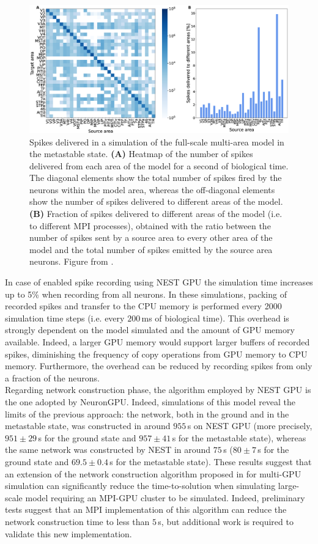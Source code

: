 \documentclass[a4paper, 12pt, twoside, openright]{book}
\begin{document}
\begin{figure}[h]
\centering
\includegraphics[width=\columnwidth]{figures/spikes_delivered.eps}
\caption{Spikes delivered in a simulation of the full-scale multi-area model in the metastable state. \textbf{(A)} Heatmap of the number of spikes delivered from each area of the model for a second of biological time. The diagonal elements show the total number of spikes fired by the neurons within the model area, whereas the off-diagonal elements show the number of spikes delivered to different areas of the model. \textbf{(B)} Fraction of spikes delivered to different areas of the model (i.e. to different MPI processes), obtained with the ratio between the number of spikes sent by a source area to every other area of the model and the total number of spikes emitted by the source area neurons. Figure from \cite{Tiddia2022}.}
\label{fig:spikes_delivered}
\end{figure}

In case of enabled spike recording using NEST GPU the simulation time increases up to 5\% when recording from all neurons. In these simulations, packing of recorded spikes and transfer to the CPU memory is performed every 2000 simulation time steps (i.e. every $200$\,ms of biological time). This overhead is strongly dependent on the model simulated and the amount of GPU memory available. Indeed, a larger GPU memory would support larger buffers of recorded spikes, diminishing the frequency of copy operations from GPU memory to CPU memory. Furthermore, the overhead can be reduced by recording spikes from only a fraction of the neurons.\\
Regarding network construction phase, the algorithm employed by NEST GPU is the one adopted by NeuronGPU. Indeed, simulations of this model reveal the limits of the previous approach: the network, both in the ground and in the metastable state, was constructed in around $955$\,s on NEST GPU (more precisely, $951\pm 29$\,s for the ground state and $957\pm 41$\,s for the metastable state), whereas the same network was constructed by NEST in around $75$\,s ($80\pm 7$\,s for the ground state and $69.5\pm 0.4$\,s for the metastable state). These results suggest that an extension of the network construction algorithm proposed in \cite{Golosio2023} for multi-GPU simulation can significantly reduce the time-to-solution when simulating large-scale model requiring an MPI-GPU cluster to be simulated. Indeed, preliminary tests suggest that an MPI implementation of this algorithm can reduce the network construction time to less than $5$\,s, but additional work is required to validate this new implementation.
\end{document}
